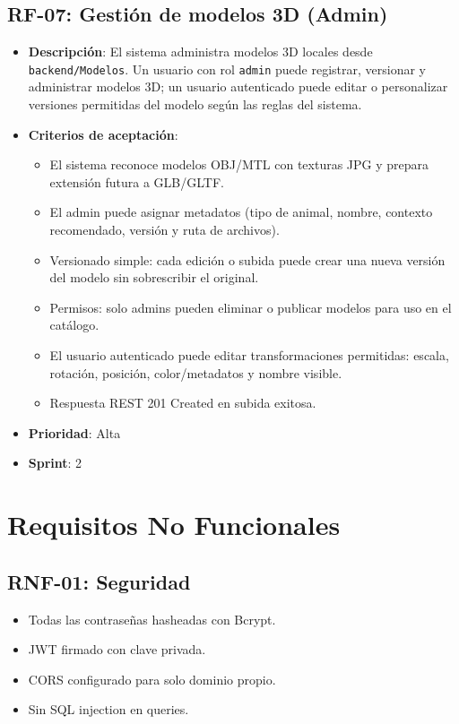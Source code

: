 \documentclass[12pt,a4paper]{article}
\begin{document}
\subsection{RF-07: Gestión de modelos 3D (Admin)}
\begin{itemize}[leftmargin=*]
    \item \textbf{Descripci\'on}: El sistema administra modelos 3D locales desde \texttt{backend/Modelos}. Un usuario con rol \texttt{admin} puede registrar, versionar y administrar modelos 3D; un usuario autenticado puede editar o personalizar versiones permitidas del modelo seg\'un las reglas del sistema.
    \item \textbf{Criterios de aceptaci\'on}:
    \begin{itemize}[leftmargin=*]
        \item El sistema reconoce modelos OBJ/MTL con texturas JPG y prepara extensi\'on futura a GLB/GLTF.
        \item El admin puede asignar metadatos (tipo de animal, nombre, contexto recomendado, versi\'on y ruta de archivos).
        \item Versionado simple: cada edici\'on o subida puede crear una nueva versi\'on del modelo sin sobrescribir el original.
        \item Permisos: solo admins pueden eliminar o publicar modelos para uso en el cat\'alogo.
        \item El usuario autenticado puede editar transformaciones permitidas: escala, rotaci\'on, posici\'on, color/metadatos y nombre visible.
        \item Respuesta REST 201 Created en subida exitosa.
    \end{itemize}
    \item \textbf{Prioridad}: Alta
    \item \textbf{Sprint}: 2
\end{itemize}

\section{Requisitos No Funcionales}

\subsection{RNF-01: Seguridad}
\begin{itemize}[leftmargin=*]
    \item Todas las contrase\~nas hasheadas con Bcrypt.
    \item JWT firmado con clave privada.
    \item CORS configurado para solo dominio propio.
    \item Sin SQL injection en queries.
\end{itemize}
\end{document}
